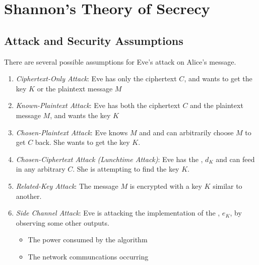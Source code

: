 \section{Shannon's Theory of Secrecy}\label{sec:Shannon_Theory_of_Secrecy}
\subsection{Attack and Security Assumptions}\label{subsec:Shannon_Attack_Security_Assumptions}
There are several possible assumptions for Eve's attack on Alice's message.
\begin{enumerate}[noitemsep]
\item \emph{Ciphertext-Only Attack}: Eve has only the ciphertext $C$, and wants to get the key $K$ or the plaintext message $M$
\item \emph{Known-Plaintext Attack}: Eve has both the ciphertext $C$ and the plaintext message $M$, and wants the key $K$
\item \emph{Chosen-Plaintext Attack}: Eve knows $M$ and and can arbitrarily choose $M$ to get $C$ back. She wants to get the key $K$.
\item \emph{Chosen-Ciphertext Attack (Lunchtime Attack)}: Eve has the , $d_{K}$ and can feed in any arbitrary $C$. She is attempting to find the key $K$.
\item \emph{Related-Key Attack}: The message $M$ is encrypted with a key $K$ similar to another.
\item \emph{Side Channel Attack}: Eve is attacking the implementation of the , $e_{K}$, by observing some other outputs.
  \begin{itemize}[noitemsep]
  \item The power consumed by the algorithm
  \item The network communcations occurring
  \end{itemize}
\end{enumerate}

